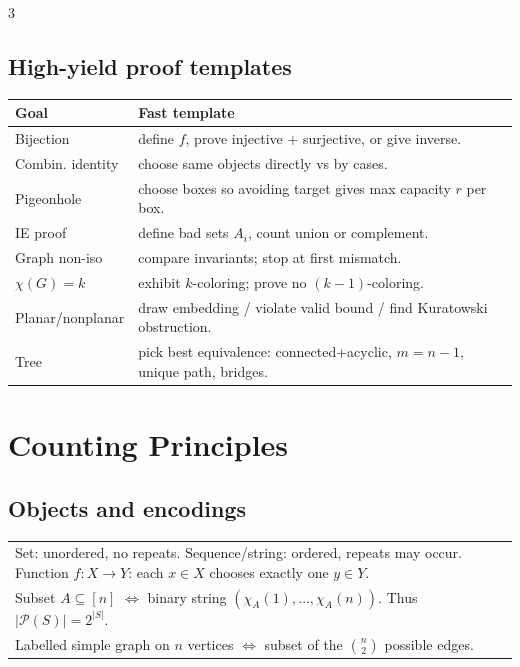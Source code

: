 \documentclass[10pt]{article}
\newcommand{\Pow}{\mathcal{P}}
\begin{document}
\begin{multicols*}{3}
\subsection*{High-yield proof templates}
\begin{tabular}{@{}p{}@{\hspace{0.02\columnwidth}}p{}@{}}
\toprule
Goal & Fast template\\
\midrule
Bijection & define \(f\), prove injective + surjective, or give inverse.\\
Combin. identity & choose same objects directly vs by cases.\\
Pigeonhole & choose boxes so avoiding target gives max capacity \(r\) per box.\\
IE proof & define bad sets \(A_i\), count union or complement.\\
Graph non-iso & compare invariants; stop at first mismatch.\\
\(\chi(G)=k\) & exhibit \(k\)-coloring; prove no \((k-1)\)-coloring.\\
Planar/nonplanar & draw embedding / violate valid bound / find Kuratowski obstruction.\\
Tree & pick best equivalence: connected+acyclic, \(m=n-1\), unique path, bridges.\\
\bottomrule
\end{tabular}

\section*{Counting Principles}
\subsection*{Objects and encodings}
\begin{tabular}{@{}p{}@{}}
Set: unordered, no repeats. Sequence/string: ordered, repeats may occur. Function \(f:X\to Y\): each \(x\in X\) chooses exactly one \(y\in Y\).\\
Subset \(A\subseteq[n]\) \(\Longleftrightarrow\) binary string \((\chi_A(1),\dots,\chi_A(n))\). Thus \(|\Pow(S)|=2^{|S|}\).\\
Labelled simple graph on \(n\) vertices \(\Longleftrightarrow\) subset of the \(\binom n2\) possible edges.\\
\end{tabular}


\end{multicols*}
\end{document}
